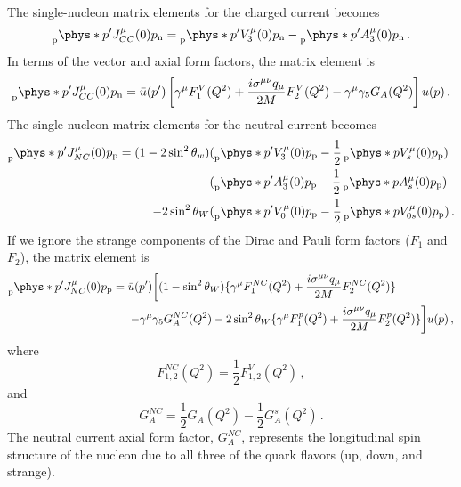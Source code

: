   The single-nucleon matrix elements for the charged current becomes
  \begin{equation}
     \prescript{}{\textrm{p}}{\phys*{p'}{J^{\mu}_{CC}(0)}{p}}_{\textrm{n}} 
       = \prescript{}{\textrm{p}}{\phys*{p'}{V^{\mu}_3(0)}{p}}_{\textrm{n}}
       - \prescript{}{\textrm{p}}{\phys*{p'}{A^{\mu}_3(0)}{p}}_{\textrm{n}} \,.
  \end{equation}
  In terms of the vector and axial form factors, the matrix element is
  \begin{equation}
     \prescript{}{\textrm{p}}{\phys*{p'}{J^{\mu}_{CC}(0)}{p}}_{\textrm{n}}
       = \bar{u}(p')\left[\gamma^{\mu} F_1^V(Q^2)
          + \frac{i\sigma^{\mu\nu}q_{\mu}}{2M} F_2^V(Q^2)
          - \gamma^{\mu}\gamma_5G_A(Q^2) \right] u(p) \,.
  \end{equation}
  The single-nucleon matrix elements for the neutral current becomes
  \begin{equation}
    \begin{aligned}
      \prescript{}{\textrm{p}}{\phys*{p'}{J^{\mu}_{NC}(0)}{p}}_{\textrm{p}} 
       = (1-2\sin^2\theta_w)&(\prescript{}{\textrm{p}}{\phys*{p'}{V^{\mu}_3(0)}{p}}_{\textrm{p}}
        - \frac{1}{2}\prescript{}{\textrm{p}}{\phys*{p}{V^{\mu}_s(0)}{p}}_{\textrm{p}}) \\
       - &(\prescript{}{\textrm{p}}{\phys*{p'}{A^{\mu}_3(0)}{p}}_{\textrm{p}}
        - \frac{1}{2}\prescript{}{\textrm{p}}{\phys*{p}{A^{\mu}_s(0)}{p}}_{\textrm{p}}) \\
       - 2\sin^2\theta_W&(\prescript{}{\textrm{p}}{\phys*{p'}{V^{\mu}_0(0)}{p}}_{\textrm{p}}
        - \frac{1}{2}\prescript{}{\textrm{p}}{\phys*{p}{V^{\mu}_{0s}(0)}{p}}_{\textrm{p}}) \,.
    \end{aligned}
  \end{equation}
  If we ignore the strange components of the Dirac and Pauli form factors
  ($F_1$ and $F_2$), the matrix element is
  \begin{equation}\label{eq:nucmatel}
    \begin{aligned}
     \prescript{}{\textrm{p}}{\phys*{p'}{J^{\mu}_{NC}(0)}{p}}_{\textrm{p}}
       = \bar{u}(p')&\bigg[(1-\sin^2\theta_W)\{\gamma^{\mu}F_1^{NC}(Q^2)
          + \frac{i\sigma^{\mu\nu}q_{\mu}}{2M}F_2^{NC}(Q^2)\}  \\
          - \gamma^{\mu}&\gamma_5 G_A^{NC}(Q^2)
          - 2\sin^2\theta_W\{\gamma^{\mu}F_1^p(Q^2) 
          + \frac{i\sigma^{\mu\nu}q_{\mu}}{2M}F_2^p(Q^2)\} \bigg]u(p) \,,
    \end{aligned}
  \end{equation}
  where
  \begin{equation}
    F_{1,2}^{NC}(Q^2) = \frac{1}{2}F_{1,2}^V(Q^2) \,,
  \end{equation}
  and
  \begin{equation}
    G_A^{NC} = \frac{1}{2}G_A(Q^2) - \frac{1}{2}G_A^s(Q^2) \,.
  \end{equation}
  The neutral current axial form factor, $G_A^{NC}$, represents the
  longitudinal spin structure of the nucleon due to all three of the quark
  flavors (up, down, and strange).
  

